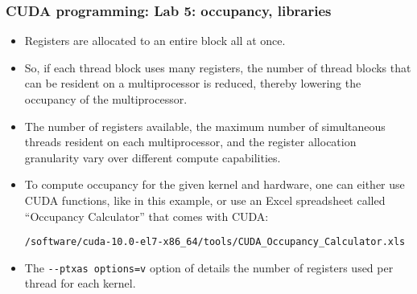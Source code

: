 \begin{frame}[fragile]
  \frametitle{CUDA programming: Lab 5: occupancy, libraries}
  \begin{itemize}
  \item Registers are allocated to an entire block all at once. 
  \item So, if each thread block uses many registers, the number of thread blocks that can be resident
    on a multiprocessor is reduced, thereby lowering the occupancy of the multiprocessor.
  \item The number of registers available, the maximum number of simultaneous threads
    resident on each multiprocessor, and the register allocation granularity vary over
    different compute capabilities.
  \item To compute occupancy for the given kernel and hardware, one can either use CUDA functions, like in this example,
    or use an Excel spreadsheet called ``Occupancy Calculator'' that comes with CUDA:
    {\tiny
      {\color{mycolorcli}
\begin{verbatim}
/software/cuda-10.0-el7-x86_64/tools/CUDA_Occupancy_Calculator.xls
\end{verbatim}
      }
    }
  \item The {\color{mycolorcli}\verb|--ptxas options=v|} option of  details the number of
    registers used per thread for each kernel.
\end{itemize}
\end{frame}

